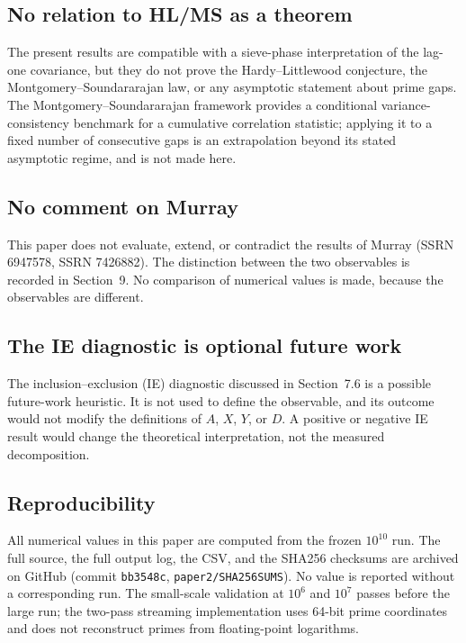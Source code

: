 \subsection{No relation to HL/MS as a theorem}

The present results are compatible with a sieve-phase interpretation of the lag-one covariance, but they do not prove the Hardy--Littlewood conjecture, the Montgomery--Soundararajan law, or any asymptotic statement about prime gaps. The Montgomery--Soundararajan framework provides a conditional variance-consistency benchmark for a cumulative correlation statistic; applying it to a fixed number of consecutive gaps is an extrapolation beyond its stated asymptotic regime, and is not made here.

\subsection{No comment on Murray}

This paper does not evaluate, extend, or contradict the results of Murray (SSRN 6947578, SSRN 7426882). The distinction between the two observables is recorded in Section~9. No comparison of numerical values is made, because the observables are different.

\subsection{The IE diagnostic is optional future work}

The inclusion--exclusion (IE) diagnostic discussed in Section~7.6 is a possible future-work heuristic. It is not used to define the observable, and its outcome would not modify the definitions of $A$, $X$, $Y$, or $D$. A positive or negative IE result would change the theoretical interpretation, not the measured decomposition.

\subsection{Reproducibility}

All numerical values in this paper are computed from the frozen $10^{10}$ run. The full source, the full output log, the CSV, and the SHA256 checksums are archived on GitHub (commit \texttt{bb3548c}, \texttt{paper2/SHA256SUMS}). No value is reported without a corresponding run. The small-scale validation at $10^6$ and $10^7$ passes before the large run; the two-pass streaming implementation uses 64-bit prime coordinates and does not reconstruct primes from floating-point logarithms.
